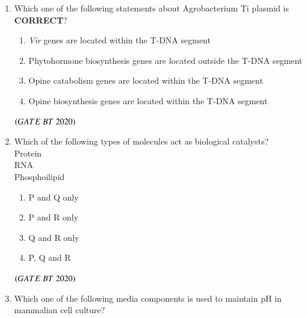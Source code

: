 \documentclass[journal,12pt,onecolumn]{IEEEtran}
\theoremstyle{remark}
\begin{document}
\begin{enumerate}[label=Q\arabic*:]
\begin{multicols}{2}
\begin{enumerate}
 \item\;Adeno-associated virus
 \item\;Adenovirus
 \item\;Lentivirus
 \item\;Herpes simplex virus

\end{enumerate} 
 \end{multicols}
\hfill$\brak{GATE\ BT\ 2020}$

\item Which one of the following statements about Agrobacterium Ti plasmid is \textbf{CORRECT}$?$
\begin{multicols}{2}
\begin{enumerate}

\item\;\textit{Vir} genes are located within the T-DNA segment
\item\;Phytohormone biosynthesis genes are located outside the T-DNA segment
\item\;Opine catabolism genes are located within the T-DNA segment
\item\;Opine biosynthesis genes are located within the T-DNA segment

\end{enumerate} 
\end{multicols}
\hfill$\brak{GATE\ BT\ 2020}$

\item Which of the following types of molecules act as biological catalysts?\\
Protein\\
RNA\\
Phosphoilipid\\
\begin{multicols}{2}
\begin{enumerate}

\item\;P and Q only
\item\;P and R only
\item\;Q and R only
\item\;P, Q and R

\end{enumerate}
\end{multicols}
\hfill$\brak{GATE\ BT\ 2020}$

\item Which one of the following media components is used to maintain pH in mammalian cell culture?
\begin{multicols}{4}
\begin{enumerate}


\end{enumerate}
\end{multicols}
\end{enumerate}
\end{document}
